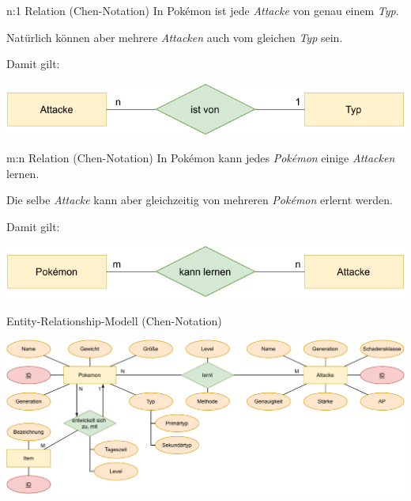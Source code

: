 \begin{example}{n:1 Relation (Chen-Notation)}
    In Pokémon ist jede \emph{Attacke} von genau einem \emph{Typ}.

    Natürlich können aber mehrere \emph{Attacken} auch vom gleichen \emph{Typ} sein.

    Damit gilt:
    \begin{center}
        \includegraphics[width=0.7\linewidth]{includes/figures/example_entity_relationship_modell_chen_many_to_one.pdf}
    \end{center}
\end{example}

\begin{example}{m:n Relation (Chen-Notation)}
    In Pokémon kann jedes \emph{Pokémon} einige \emph{Attacken} lernen.

    Die selbe \emph{Attacke} kann aber gleichzeitig von mehreren \emph{Pokémon} erlernt werden.

    Damit gilt:
    \begin{center}
        \includegraphics[width=0.7\linewidth]{includes/figures/example_entity_relationship_modell_chen_many_to_many.pdf}
    \end{center}
\end{example}

\begin{example}{Entity-Relationship-Modell (Chen-Notation)}
    \begin{center}
        \includegraphics[width=\linewidth]{includes/figures/example_entity_relationship_modell_full.pdf}
    \end{center}
\end{example}

